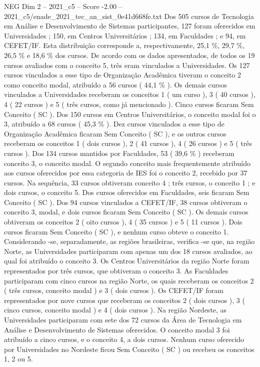 \begin{textsample}{NEG Dim 2 – 2021\_c5 – Score -2.00 – 2021\_c5/enade\_2021\_tec\_an\_sist\_0e41d668fe.txt}
Dos 505 cursos de Tecnologia em Análise e Desenvolvimento de Sistemas participantes, 127 foram oferecidos em Universidades ; 150, em Centros Universitários ; 134, em Faculdades ; e 94, em CEFET/IF.
Esta distribuição corresponde a, respectivamente, 25,1 \%, 29,7 \%, 26,5 \% e 18,6 \% dos cursos.
De acordo com os dados apresentados, de todos os 19 cursos avaliados com o conceito 5, três eram vinculados a Universidades.
Os 127 cursos vinculados a esse tipo de Organização Acadêmica tiveram o conceito 2 como conceito modal, atribuído a 56 cursos ( 44,1 \% ).
Os demais cursos vinculados a Universidades receberam os conceitos 1 ( um curso ), 3 ( 40 cursos ), 4 ( 22 cursos ) e 5 ( três cursos, como já mencionado ).
Cinco cursos ficaram Sem Conceito ( SC ).
Dos 150 cursos em Centros Universitários, o conceito modal foi o 3, atribuído a 68 cursos ( 45,3 \% ).
Dez cursos vinculados a esse tipo de Organização Acadêmica ficaram Sem Conceito ( SC ), e os outros cursos receberam os conceitos 1 ( dois cursos ), 2 ( 41 cursos ), 4 ( 26 cursos ) e 5 ( três cursos ).
Dos 134 cursos mantidos por Faculdades, 53 ( 39,6 \% ) receberam conceito 3, o conceito modal.
O segundo conceito mais frequentemente atribuído aos cursos oferecidos por essa categoria de IES foi o conceito 2, recebido por 37 cursos.
Na sequência, 33 cursos obtiveram conceito 4 ; três cursos, o conceito 1 ; e dois cursos, o conceito 5.
Dos cursos oferecidos em Faculdades, seis ficaram Sem Conceito ( SC ).
Dos 94 cursos vinculados a CEFET/IF, 38 cursos obtiveram o conceito 3, modal, e dois cursos ficaram Sem Conceito ( SC ).
Os demais cursos obtiveram os conceitos 2 ( oito cursos ), 4 ( 35 cursos ) e 5 ( 11 cursos ).
Dois cursos ficaram Sem Conceito ( SC ), e nenhum curso obteve o conceito 1.
Considerando -se, separadamente, as regiões brasileiras, verifica -se que, na região Norte, as Universidades participaram com apenas um dos 18 cursos avaliados, ao qual foi atribuído o conceito 3.
Os Centros Universitários da região Norte foram representados por três cursos, que obtiveram o conceito 3.
As Faculdades participaram com cinco cursos na região Norte, os quais receberam os conceitos 2 ( três cursos, conceito modal ) e 3 ( dois cursos ).
Os CEFET/IF foram representados por nove cursos que receberam os conceitos 2 ( dois cursos ), 3 ( cinco cursos, conceito modal ) e 4 ( dois cursos ).
Na região Nordeste, as Universidades participaram com sete dos 72 cursos da Área de Tecnologia em Análise e Desenvolvimento de Sistemas oferecidos.
O conceito modal 3 foi atribuído a cinco cursos, e o conceito 4, a dois cursos.
Nenhum curso oferecido por Universidades no Nordeste ficou Sem Conceito ( SC ) ou recebeu os conceitos 1, 2 ou 5.

\end{textsample}
